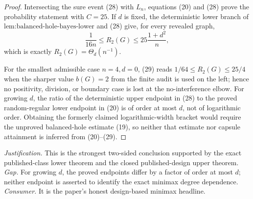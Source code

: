 \documentclass{article}
\begin{document}
\begin{proof}
Intersecting the sure event (28) with \(L_n\), equations (20) and (28) prove the probability statement with \(C=25\).  If \(d\) is fixed, the deterministic lower branch of \(\text{lem:balanced-hole-bayes-lower}\) and (28) give, for every revealed graph,
\[
\frac1{16n}\le R_2(G)\le25\frac{1+d^2}{n}, \tag{29}
\]
which is exactly \(R_2(G)=\Theta_d(n^{-1})\).

For the smallest admissible case \(n=4,d=0\), (29) reads \(1/64\le R_2(G)\le25/4\) when the sharper value \(b(G)=2\) from the finite audit is used on the left; hence no positivity, division, or boundary case is lost at the no-interference elbow.  For growing \(d\), the ratio of the deterministic upper endpoint in (28) to the proved random-regular lower endpoint in (20) is of order at most \(d\), not of logarithmic order.  Obtaining the formerly claimed logarithmic-width bracket would require the unproved balanced-hole estimate (19), so neither that estimate nor capsule attainment is inferred from (20)--(29).
\end{proof}
\par\smallskip\noindent \textit{Justification.} This is the strongest two-sided conclusion supported by the exact published-class lower theorem and the closed published-design upper theorem. \textit{Gap.} For growing \(d\), the proved endpoints differ by a factor of order at most \(d\); neither endpoint is asserted to identify the exact minimax degree dependence. \textit{Consumer.} It is the paper's honest design-based minimax headline.
\end{document}
